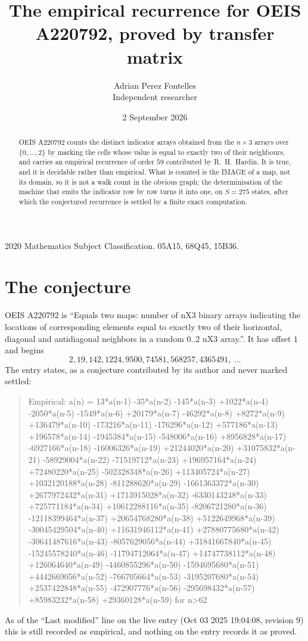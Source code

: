 \documentclass[11pt,a4paper]{article}
\title{The empirical recurrence for OEIS A220792, proved by transfer matrix}
\author{Adrian Perez Fontelles\\ \small Independent researcher}
\date{2 September 2026}
\theoremstyle{plain}
\theoremstyle{definition}
\begin{document}
\maketitle

\begin{abstract}
OEIS A220792 counts the distinct indicator arrays obtained from the $n\times3$ arrays over
$\{0,\dots,2\}$ by marking the cells whose value is equal to exactly two of their neighbours, and carries an
empirical recurrence of order $59$ contributed by R.~H.~Hardin. It is true, and it is
decidable rather than empirical. What is counted is the IMAGE of a map, not its domain, so it
is not a walk count in the obvious graph; the determinisation of the machine that emits the
indicator row by row turns it into one, on $S=275$ states, after which the conjectured
recurrence is settled by a finite exact computation.
\end{abstract}

\noindent\small 2020 Mathematics Subject Classification. 05A15, 68Q45, 15B36.\normalsize

\section{The conjecture}

OEIS A220792 is ``Equals two maps: number of nX3 binary arrays indicating the locations of corresponding elements equal to exactly two of their horizontal, diagonal and antidiagonal neighbors in a random 0..2 nX3 array.''. It has offset $1$ and begins
\[
2, 19, 142, 1224, 9500, 74581, 568257, 4365491,\ \dots
\]
The entry states, as a conjecture contributed by its author and never marked settled:
\begin{quote}
Empirical: a(n) = 13*a(n-1) -35*a(n-2) -145*a(n-3) +1022*a(n-4) -2050*a(n-5) -1549*a(n-6) +20179*a(n-7) -46292*a(n-8) +8272*a(n-9) +136479*a(n-10) -173216*a(n-11) -176296*a(n-12) +577186*a(n-13) +196578*a(n-14) -1945384*a(n-15) -548006*a(n-16) +8956828*a(n-17) -6927166*a(n-18) -16006326*a(n-19) +21244020*a(n-20) +31075832*a(n-21) -58929004*a(n-22) -71519712*a(n-23) +196957164*a(n-24) +72480220*a(n-25) -502328348*a(n-26) +113405724*a(n-27) +1032120188*a(n-28) -811288620*a(n-29) -1661363372*a(n-30) +2677972432*a(n-31) +1713915028*a(n-32) -6330143248*a(n-33) +725771184*a(n-34) +10612288116*a(n-35) -8206721280*a(n-36) -12118399464*a(n-37) +20654768280*a(n-38) +5122649968*a(n-39) -30045429504*a(n-40) +11631946112*a(n-41) +27880775680*a(n-42) -30641487616*a(n-43) -8057629056*a(n-44) +31841667840*a(n-45) -15245578240*a(n-46) -11794712064*a(n-47) +14747738112*a(n-48) +126064640*a(n-49) -4460855296*a(n-50) -1594695680*a(n-51) +4442669056*a(n-52) -766705664*a(n-53) -3195207680*a(n-54) +2537422848*a(n-55) -472907776*a(n-56) -295698432*a(n-57) +85983232*a(n-58) +29360128*a(n-59) for n>62
\end{quote}
As of the ``Last modified'' line on the live entry (Oct 03 2025 19:04:08, revision 9) this is still
recorded as empirical, and nothing on the entry records it as proved.
\end{document}

